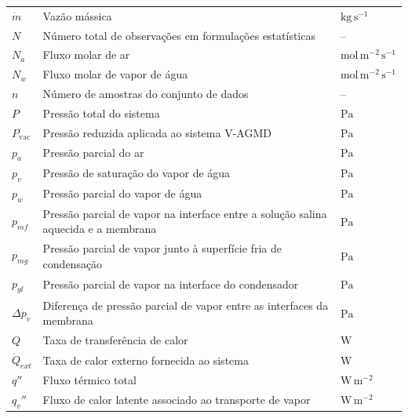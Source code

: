 \begin{longtable}{>{\raggedright\arraybackslash}p{3cm}
                  >{\raggedright\arraybackslash}p{9.5cm}
                  >{\raggedright\arraybackslash}p{3cm}}
$\dot{m}$ & Vazão mássica & $\mathrm{kg\,s^{-1}}$ \\

$N$ & Número total de observações em formulações estatísticas & -- \\

$N_a$ & Fluxo molar de ar & $\mathrm{mol\,m^{-2}\,s^{-1}}$ \\

$N_w$ & Fluxo molar de vapor de água & $\mathrm{mol\,m^{-2}\,s^{-1}}$ \\

$n$ & Número de amostras do conjunto de dados & -- \\

$P$ & Pressão total do sistema & $\mathrm{Pa}$ \\

$P_{\mathrm{vac}}$ & Pressão reduzida aplicada ao sistema V-AGMD & $\mathrm{Pa}$ \\

$p_a$ & Pressão parcial do ar & $\mathrm{Pa}$ \\

$p_v$ & Pressão de saturação do vapor de água & $\mathrm{Pa}$ \\

$p_w$ & Pressão parcial do vapor de água & $\mathrm{Pa}$ \\

$p_{mf}$ & Pressão parcial de vapor na interface entre a solução salina aquecida e a membrana & $\mathrm{Pa}$ \\

$p_{mg}$ & Pressão parcial de vapor junto à superfície fria de condensação & $\mathrm{Pa}$ \\

$p_{gl}$ & Pressão parcial de vapor na interface do condensador & $\mathrm{Pa}$ \\

$\Delta p_v$ & Diferença de pressão parcial de vapor entre as interfaces da membrana & $\mathrm{Pa}$ \\

$Q$ & Taxa de transferência de calor & $\mathrm{W}$ \\

$\dot{Q}_{ext}$ & Taxa de calor externo fornecida ao sistema & $\mathrm{W}$ \\

$q''$ & Fluxo térmico total & $\mathrm{W\,m^{-2}}$ \\

$q_v''$ & Fluxo de calor latente associado ao transporte de vapor & $\mathrm{W\,m^{-2}}$ \\


\end{longtable}
